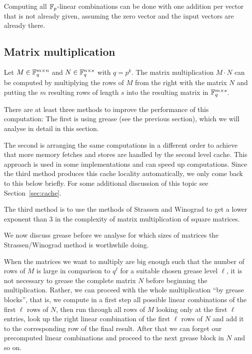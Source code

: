 \begin{Rem}
Computing all $\mathbb{F}_p$-linear combinations can be done
with one addition per vector that is not already given, assuming
the zero vector and the input vectors are already there.
\end{Rem}

\subsection{Matrix multiplication}

Let $M \in \mathbb{F}_q^{m \times n}$ and $N \in \mathbb{F}_q^{n \times s}$ with $q = p^k$.
The matrix multiplication $M \cdot N$ can be computed by multiplying the
rows of $M$ from the right with the matrix $N$ and putting the $m$ resulting
rows of length $s$ into the resulting matrix in $\mathbb{F}_q^{m \times s}$.

There are at least three methods to improve the performance of this
computation: The first is using grease (see the previous section), which
we will analyse in detail in this section. 

The second is arranging the same computations in a different order to 
achieve that more memory fetches and stores are handled by the second
level cache. This approach is used in some implementations and can
speed up computations. Since the third method produces this cache locality
automatically, we only come back to this below briefly.
For some additional discussion of this topic see Section~\ref{sec:cache}. 

The third method is to use the methods of Strassen and Winograd to
get a lower exponent than $3$ in the complexity of matrix multiplication
of square matrices.

We now discuss grease before we analyse for which sizes of
matrices the Strassen/Winograd method is worthwhile doing.

When the matrices we want to multiply are big enough such that the number
of rows of $M$ is large in comparison to $q^\ell$
for a suitable chosen grease level $\ell$, it is not necessary to grease
the complete matrix $N$ before beginning the multiplication. Rather,
we can proceed with the whole multiplication ``by grease blocks'', that
is, we compute in a first step all possible linear combinations of the
first $\ell$ rows of $N$, then run through all rows of $M$ looking
only at the first $\ell$ entries, look up the right
linear combination of the first $\ell$ rows of $N$ and add it 
to the corresponding
row of the final result. After that we can forget our precomputed linear
combinations and proceed to the next grease block in $N$ and so on.

